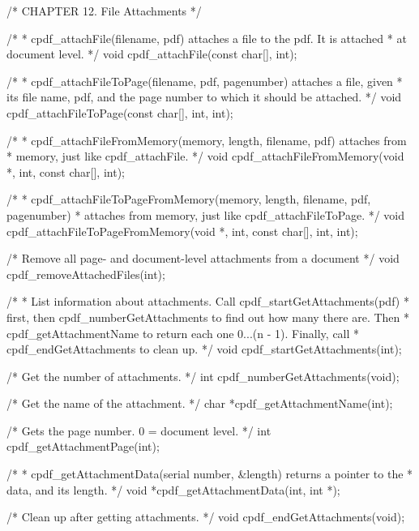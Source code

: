 /* CHAPTER 12. File Attachments */

/*
 * cpdf_attachFile(filename, pdf) attaches a file to the pdf. It is attached
 * at document level.
 */
void cpdf_attachFile(const char[], int);

/*
 * cpdf_attachFileToPage(filename, pdf, pagenumber) attaches a file, given
 * its file name, pdf, and the page number to which it should be attached.
 */
void cpdf_attachFileToPage(const char[], int, int);

/*
 * cpdf_attachFileFromMemory(memory, length, filename, pdf) attaches from
 * memory, just like cpdf_attachFile.
 */
void cpdf_attachFileFromMemory(void *, int, const char[], int);

/*
 * cpdf_attachFileToPageFromMemory(memory, length, filename, pdf, pagenumber)
 * attaches from memory, just like cpdf_attachFileToPage.
 */
void cpdf_attachFileToPageFromMemory(void *, int, const char[], int, int);

/* Remove all page- and document-level attachments from a document */
void cpdf_removeAttachedFiles(int);

/*
 * List information about attachments. Call cpdf_startGetAttachments(pdf)
 * first, then cpdf_numberGetAttachments to find out how many there are. Then
 * cpdf_getAttachmentName to return each one 0...(n - 1). Finally, call
 * cpdf_endGetAttachments to clean up.
 */
void cpdf_startGetAttachments(int);

/* Get the number of attachments. */
int cpdf_numberGetAttachments(void);

/* Get the name of the attachment. */
char *cpdf_getAttachmentName(int);

/* Gets the page number. 0 = document level. */
int cpdf_getAttachmentPage(int);

/*
 * cpdf_getAttachmentData(serial number, &length) returns a pointer to the
 * data, and its length.
 */
void *cpdf_getAttachmentData(int, int *);

/* Clean up after getting attachments. */
void cpdf_endGetAttachments(void);

